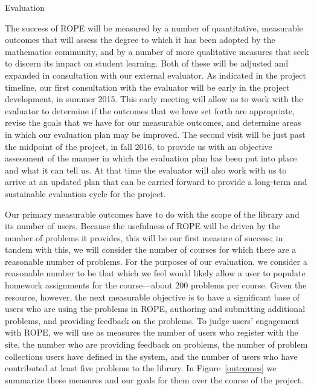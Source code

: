 \documentclass[11pt]{article}
\begin{document}
\begin{section}{Evaluation}

The success of ROPE will be measured by a number of quantitative,
measurable outcomes that will assess the degree to which it has been
adopted by the mathematics community, and by a number of more qualitative
measures that seek to discern its impact on student learning.  Both of
these will be adjusted and expanded in consultation with our external
evaluator.  As indicated in the project timeline, our first consultation
with the evaluator will be early in the project development, in summer
2015.  This early meeting will allow us to work with the evaluator to
determine if the outcomes that we have set forth are appropriate, revise
the goals that we have for our measurable outcomes, and determine areas in
which our evaluation plan may be improved.  The second visit will be just
past the midpoint of the project, in fall 2016, to provide us with an
objective assessment of the manner in which the evaluation plan has been
put into place and what it can tell us.  At that time the evaluator will
also work with us to arrive at an updated plan that can be carried forward
to provide a long-term and sustainable evaluation cycle for the project.

Our primary measurable outcomes have to do with the scope of the library
and its number of users.  Because the usefulness of ROPE will be driven
by the number of problems it provides, this will be our first measure of
success; in tandem with this, we will consider the number of courses for
which there are a reasonable number of problems.  For the purposes of our
evaluation, we consider a reasonable number to be that which we feel would
likely allow a user to populate homework assignments for the
course---about 200 problems per course.  Given the resource, however, the next
measurable objective is to have a significant base of users who are using
the problems in ROPE, authoring and submitting additional problems, and
providing feedback on the problems.  To judge users' engagement with ROPE, we will use as measures the number of users who register with the
site, the number who are providing feedback on problems, the number of
problem collections users have defined in the system, and the number of
users who have contributed at least five problems to the library.  In
Figure~\ref{outcomes} we summarize these measures and our goals for them
over the course of the project.


\end{section}
\end{document}
